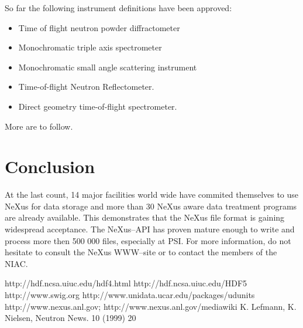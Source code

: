 So far the following instrument definitions have been approved:
\begin{itemize}
\item Time of flight neutron powder diffractometer
\item Monochromatic triple axis spectrometer
\item Monochromatic small angle scattering instrument
\item Time-of-flight Neutron Reflectometer.
\item Direct geometry time-of-flight spectrometer.
\end{itemize}
More are to follow.

\section{Conclusion}
At the last count, 14 major facilities world wide have commited
themselves to use NeXus for data storage and more than 30 NeXus aware
data treatment programs are already available. This demonstrates that the
NeXus file format is gaining widespread acceptance. The NeXus--API has
proven mature enough to write and process more then 500 000 files, 
especially at PSI. For more information,
do not hesitate to consult the NeXus WWW--site\cite{nx} or to contact
the members of the NIAC.  

%
%
%
%

\begin{thebibliography}{00}

 http://hdf.ncsa.uiuc.edu/hdf4.html
 http://hdf.ncsa.uiuc.edu/HDF5
 http://www.swig.org
 http://www.unidata.ucar.edu/packages/udunits
 http://www.nexus.anl.gov; http://www.nexus.anl.gov/mediawiki
K. Lefmann, K. Nielsen, Neutron News. 10 (1999) 20

\end{thebibliography}

%
%
%
%





